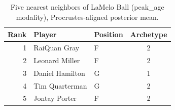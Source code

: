 \begin{table}[htbp]
  \centering\small
  \begin{tabular}{rllc}
    \toprule
    Rank & Player & Position & Archetype \\
    \midrule
    1 & RaiQuan Gray & F & 2 \\
    2 & Leonard Miller & F & 2 \\
    3 & Daniel Hamilton & G & 1 \\
    4 & Tim Quarterman & G & 2 \\
    5 & Jontay Porter & F & 2 \\
    \bottomrule
  \end{tabular}
  \caption{Five nearest neighbors of LaMelo Ball (peak_age modality), Procrustes-aligned posterior mean.}
  \label{tab:LaMelo_Ball_neighbors_peak_age}
\end{table}

